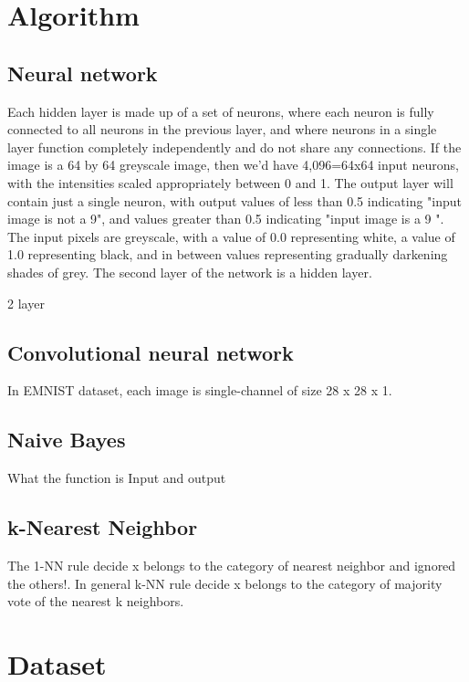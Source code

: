 \section{Algorithm}
\subsection{Neural network}
 Each hidden layer is made up of a set of neurons, where each neuron is fully connected to all neurons in the previous layer, and where neurons in a single layer function completely independently and do not share any connections. If the image is a 64 by 64 greyscale image, then we'd have 4,096=64x64 input neurons, with the intensities scaled appropriately between 0 and 1. The output layer will contain just a single neuron, with output values of less than 0.5 indicating "input image is not a 9", and values greater than 0.5 indicating "input image is a 9 ". The input pixels are greyscale, with a value of 0.0 representing white, a value of 1.0 representing black, and in between values representing gradually darkening shades of grey. The second layer of the network is a hidden layer.

2 layer
\subsection{Convolutional neural network}
In EMNIST dataset, each image is single-channel of size 28 x 28 x 1. 

\subsection{Naive Bayes}
What the function is 
Input and output


\subsection{k-Nearest Neighbor}
The 1-NN rule decide x belongs to the category of nearest neighbor and ignored the others!.
In general k-NN rule decide x belongs to the category of majority vote of the nearest k neighbors.

\section{Dataset}
